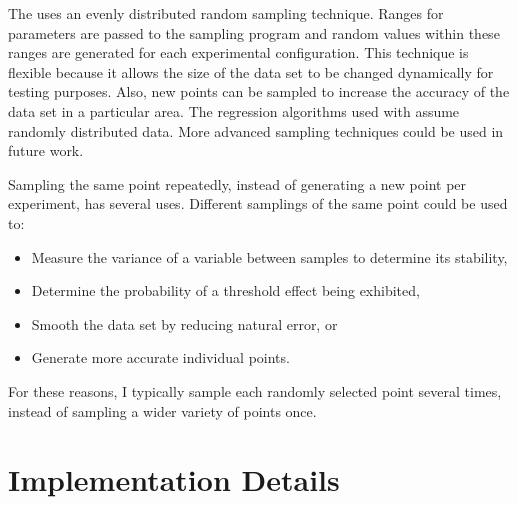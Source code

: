 The \fw uses an evenly distributed random sampling technique.
Ranges for parameters are passed to the sampling program and random values within these ranges are generated for each experimental configuration.
This technique is flexible because it allows the size of the data set to be changed dynamically for testing purposes.
Also, new points can be sampled to increase the accuracy of the data set in a particular area.
The regression algorithms used with \fw assume randomly distributed data.
More advanced sampling techniques could be used in future work.

Sampling the same point repeatedly, instead of generating a new point per experiment, has several uses.
Different samplings of the same point could be used to:
\begin{itemize}
   \item Measure the variance of a variable between samples to determine its stability,
   \item Determine the probability of a threshold effect being exhibited,
   \item Smooth the data set by reducing natural error, or
   \item Generate more accurate individual points.
\end{itemize}
For these reasons, I typically sample each randomly selected point several times, instead of sampling a wider variety of points once.

\section{Implementation Details}

